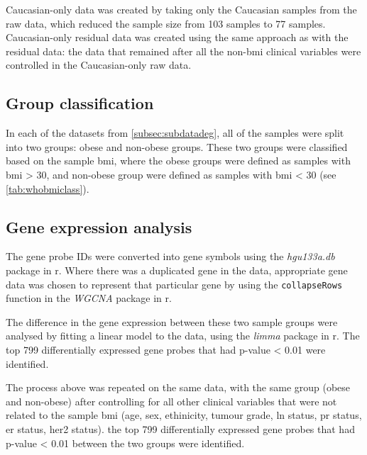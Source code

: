 Caucasian-only data was created by taking only the Caucasian samples from the raw data, which reduced the sample size from 103 samples to 77 samples.
Caucasian-only residual data was created using the same approach as with the residual data: the data that remained after all the non-\gls{bmi} clinical variables were controlled in the Caucasian-only raw data.

\subsection{Group classification}
\label{subsec:crdegclass}

In each of the datasets from \cref{subsec:subdatadeg}, all of the samples were split into two groups: obese and non-obese groups.
These two groups were classified based on the sample \gls{bmi}, where the obese groups were defined as samples with \gls{bmi}  \textgreater{} 30, and non-obese group were defined as samples with \gls{bmi}  \textless{} 30 (see \cref{tab:whobmiclass}).

\subsection{Gene expression analysis}
\label{subsec:crdeg}

The gene probe IDs were converted into gene symbols using the \textit{hgu133a.db} package in \gls{r}.
Where there was a duplicated gene in the data, appropriate gene data was chosen to represent that particular gene by using the \texttt{collapseRows} function in the \textit{WGCNA} package in \gls{r}.






The difference in the gene expression between these two sample groups were analysed by fitting a linear model to the data, using the \textit{limma} package in \gls{r}.
The top 799 differentially expressed gene probes that had p-value \textless{} 0.01 were identified.





















\newpage



The process above was repeated on the same data, with the same group (obese and non-obese) after controlling for all other clinical variables that were not related to the sample \gls{bmi} (age, sex, ethinicity, tumour grade, \gls{ln} status, \gls{pr} status, \gls{er} status, \gls{her2} status).
the top 799 differentially expressed gene probes that had p-value \textless{} 0.01 between the two groups were identified.

